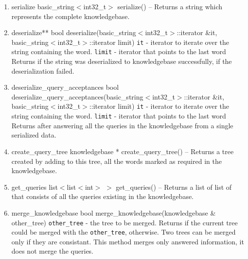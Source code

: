 \begin{enumerate}
\begin{detail}
{Generates the ``.dot'' file of the knowledgebase for graphical representation.} 
\end{detail}
\item \begin{detail}
{serialize}
{basic\_string$<$int32\_t$>$ serialize()}
{--}
{Returns a string which represents the complete knowledgebase.} 
\end{detail}
\item \begin{detail}
{deserialize**}
{bool deserialize(basic\_string$<$int32\_t$>$::iterator \&it, \\ basic\_string$<$int32\_t$>$::iterator limit)}
{\texttt{it} - iterator to iterate over the string containing the word.
 \texttt{limit} - iterator that points to the last word }
{Returns \true if the string was deserialized to knowledgebase successfully, \false if the deserialization failed.} 
\end{detail}
\item \begin{detail}
{deserialize\_query\_acceptances}
{bool deserialize\_query\_acceptances(basic\_string$<$int32\_t$>$::iterator \&it,\\ basic\_string$<$int32\_t$>$::iterator limit)}
{\texttt{it} - iterator to iterate over the string containing the word.
 \texttt{limit} - iterator that points to the last word }
{Returns \true after answering all the queries in the knowledgebase from a single serialized data. } 
\end{detail}
\item \begin{detail}
{create\_query\_tree}
{knowledgebase * create\_query\_tree()}
{--}
{Returns a tree created by adding to this tree, all the words marked as required in the knowledgebase.} 
\end{detail}
\item \begin{detail}
{get\_queries}
{list$<$list$<$int$>$ $>$ get\_queries()}
{--}
{Returns a list of list of \integer that consists of all the queries existing in the knowledgebase.} 
\end{detail}
\item \begin{detail}
{merge\_knowledgebase}
{bool merge\_knowledgebase(knowledgebase \& other\_tree)}
{\texttt{other\_tree} - the tree to be merged.}
{Returns \true if the current tree could be merged with the \texttt{other\_tree}, \false otherwise. Two trees can be merged only if they are consistant. This method merges only answered information, it does not merge the queries. } 

\end{detail}
\end{enumerate}
